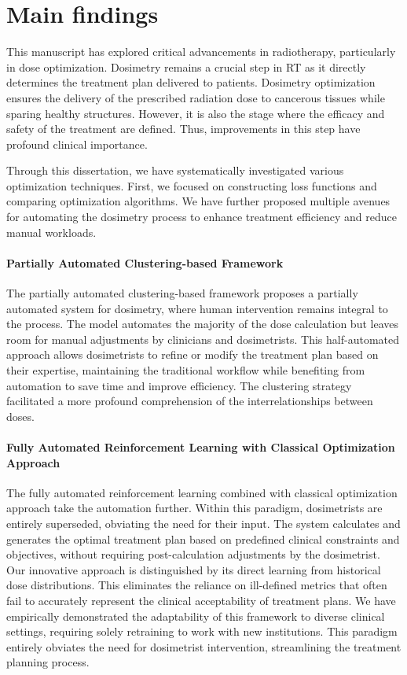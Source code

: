 \section{Main findings}
This manuscript has explored critical advancements in radiotherapy, particularly in dose optimization.
Dosimetry remains a crucial step in RT as it directly determines the treatment plan delivered to patients.
Dosimetry optimization ensures the delivery of the prescribed radiation dose to cancerous tissues while sparing healthy structures.
However, it is also the stage where the efficacy and safety of the treatment are defined.
Thus, improvements in this step have profound clinical importance.

Through this dissertation, we have systematically investigated various optimization techniques.
First, we focused on constructing loss functions and comparing optimization algorithms.
We have further proposed multiple avenues for automating the dosimetry process to enhance treatment efficiency and reduce manual workloads.

\paragraph{Partially Automated Clustering-based Framework}
The partially automated clustering-based framework proposes a partially automated system for dosimetry, where human intervention remains integral to the process.
The model automates the majority of the dose calculation but leaves room for manual adjustments by clinicians and dosimetrists.
This half-automated approach allows dosimetrists to refine or modify the treatment plan based on their expertise, maintaining the traditional workflow while benefiting from automation to save time and improve efficiency.
The clustering strategy facilitated a more profound comprehension of the interrelationships between doses.

\paragraph{Fully Automated Reinforcement Learning with Classical Optimization Approach}
The fully automated reinforcement learning combined with classical optimization approach take the automation further.
Within this paradigm, dosimetrists are entirely superseded, obviating the need for their input.
The system calculates and generates the optimal treatment plan based on predefined clinical constraints and objectives, without requiring post-calculation adjustments by the dosimetrist.
Our innovative approach is distinguished by its direct learning from historical dose distributions.
This eliminates the reliance on ill-defined metrics that often fail to accurately represent the clinical acceptability of treatment plans.
We have empirically demonstrated the adaptability of this framework to diverse clinical settings, requiring solely retraining to work with new institutions.
This paradigm entirely obviates the need for dosimetrist intervention, streamlining the treatment planning process.

